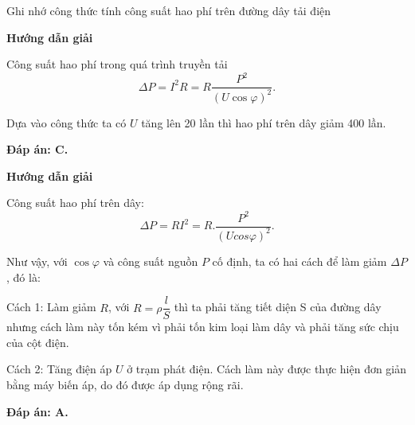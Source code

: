 \begin{dang}{Ghi nhớ công thức tính công suất hao phí trên đường dây tải điện}
	
	{\begin{center}
			\textbf{Hướng dẫn giải}
		\end{center}
		
		Công suất hao phí trong quá trình truyền tải
		\begin{equation*}
			\Delta P = I^2R =R\dfrac{P^2}{(U \cos \varphi)^2}.
		\end{equation*}
		
		Dựa vào công thức ta có $U$ tăng lên 20 lần thì hao phí trên dây giảm 400 lần.
		
		\textbf{Đáp án: C.}
	}
	{\begin{center}
			\textbf{Hướng dẫn giải}
		\end{center}
		
		Công suất hao phí trên dây:
		$$\Delta P=R{{I}^{2}}=R.\dfrac{{{P}^{2}}}{{{\left( Ucos\varphi \right)}^{2}}}.$$
		
		Như vậy, với $\cos\varphi$ và công suất nguồn $P$ cố định, ta có hai cách để làm giảm $\Delta P$, đó là:
		
		Cách 1: Làm giảm $R$, với $R=\rho \dfrac{l}{S}$ thì ta phải tăng tiết diện S của đường dây nhưng cách làm này tốn kém vì phải tốn kim loại làm dây và phải tăng sức chịu của cột điện.
		
		Cách 2: Tăng điện áp $U$ ở trạm phát điện. Cách làm này được thực hiện đơn giản bằng máy biến áp, do đó được áp dụng rộng rãi.
		
		\textbf{Đáp án: A.}
	}
	
\end{dang}
